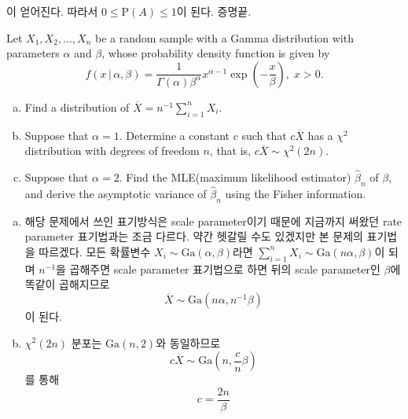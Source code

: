\documentclass[answers]{exam}
\begin{document}
\begin{questions}
\begin{solution}
\begin{enumerate}[(1)]
        이 얻어진다. 따라서 $0\leq \mathrm{P}\left(A\right)\leq 1$이 된다. 증명끝.
      \end{enumerate}
   \end{solution}
   \question
   Let $X_{1},X_{2},\ldots,X_{n}$ be a random sample with a Gamma distribution with parameters $\alpha$ and $\beta$, whose probability density function is given by
   \begin{equation}
    f\left(x\,|\,\alpha,\beta\right) = \dfrac{1}{\Gamma\left(\alpha\right)\beta^{\alpha}}x^{\alpha-1}\exp\left(-\dfrac{x}{\beta}\right),\;x>0.
   \end{equation}
   \begin{enumerate}[(a)]
    \item Find a distribution of $\overline{X}=n^{-1}\sum_{i=1}^{n}X_{i}$.
    \item Suppose that $\alpha=1$. Determine a constant $c$ such that $c\overline{X}$ has a $\chi^{2}$ distribution with degrees of freedom $n$, that is, $c\overline{X}\sim\chi^{2}\left(2n\right)$.
    \item Suppose that $\alpha=2$. Find the MLE(maximum likelihood estimator) $\widehat{\beta}_{n}$ of $\beta$, and derive the asymptotic variance of $\widehat{\beta}_{n}$ using the Fisher information.
   \end{enumerate}
   \begin{solution}
    \begin{enumerate}[(a)]
      \item 해당 문제에서 쓰인 표기방식은 scale parameter이기 때문에 지금까지 써왔던 rate parameter 표기법과는 조금 다르다. 약간 헷갈릴 수도 있겠지만 본 문제의 표기법을 따르겠다. 모든 확률변수 $X_{i}\sim \mathrm{Ga}\left(\alpha,\beta\right)$라면 $\sum_{i=1}^{n}X_{i}\sim \mathrm{Ga}\left(n\alpha,\beta\right)$이 되며 $n^{-1}$을 곱해주면 scale parameter 표기법으로 하면 뒤의 scale parameter인 $\beta$에 똑같이 곱해지므로
      \begin{equation}
        \overline{X} \sim \mathrm{Ga}\left(n\alpha,n^{-1}\beta\right)
      \end{equation}
      이 된다.
      \item $\chi^{2}\left(2n\right)$ 분포는 $\mathrm{Ga}\left(n,2\right)$와 동일하므로
      \begin{equation}
        c\overline{X} \sim \mathrm{Ga}\left(n,\dfrac{c}{n}\beta\right)
      \end{equation}
      를 통해
      \begin{equation}
        c= \dfrac{2n}{\beta}
      \end{equation}

\end{enumerate}
\end{solution}
\end{questions}
\end{document}
